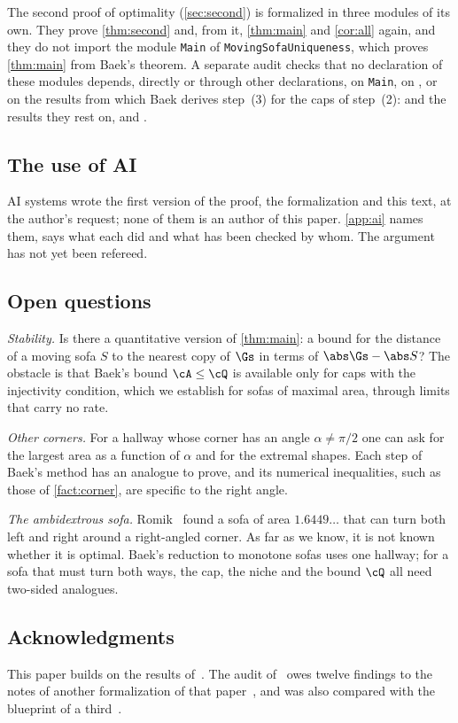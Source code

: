 The second proof of optimality (\cref{sec:second}) is formalized in three
modules of its own. They prove \cref{thm:second} and, from it, \cref{thm:main}
and \cref{cor:all} again, and they do not import the module \texttt{Main} of
\texttt{MovingSofaUniqueness}, which proves \cref{thm:main} from Baek's theorem.
A separate audit checks that no declaration of these modules depends, directly
or through other declarations, on \texttt{Main}, on , or on the
results from which Baek derives step~(3) for the caps of step~(2):
 and the results they rest on,
 and
.

\subsection{The use of AI}

AI systems wrote the first version of the proof, the formalization and this
text, at the author's request; none of them is an author of this paper.
\cref{app:ai} names them, says what each did and what has been checked by whom.
The argument has not yet been refereed.

\subsection{Open questions}

\emph{Stability.} Is there a quantitative version of \cref{thm:main}: a bound
for the distance of a moving sofa $S$ to the nearest copy of $\Gs$ in terms of
$\abs\Gs-\abs S$? The obstacle is that Baek's bound $\cA\le\cQ$ is available
only for caps with the injectivity condition, which we establish for sofas of
maximal area, through limits that carry no rate.

\emph{Other corners.} For a hallway whose corner has an angle $\alpha\ne\pi/2$
one can ask for the largest area as a function of $\alpha$ and for the extremal
shapes. Each step of Baek's method has an analogue to prove, and its numerical
inequalities, such as those of \cref{fact:corner}, are specific to the right
angle.

\emph{The ambidextrous sofa.} Romik~\cite{Romik18} found a sofa of area
$1.6449\ldots$ that can turn both left and right around a right-angled corner.
As far as we know, it is not known whether it is optimal. Baek's reduction to
monotone sofas uses one hallway; for a sofa that must turn both ways, the cap,
the niche and the bound $\cQ$ all need two-sided analogues.

\subsection*{Acknowledgments}
This paper builds on the results of~\cite{Baek}. The audit of~\cite{Baek} owes
twelve findings to the notes of another formalization of that
paper~\cite{Cureton}, and was also compared with the blueprint of a
third~\cite{Cao}.
